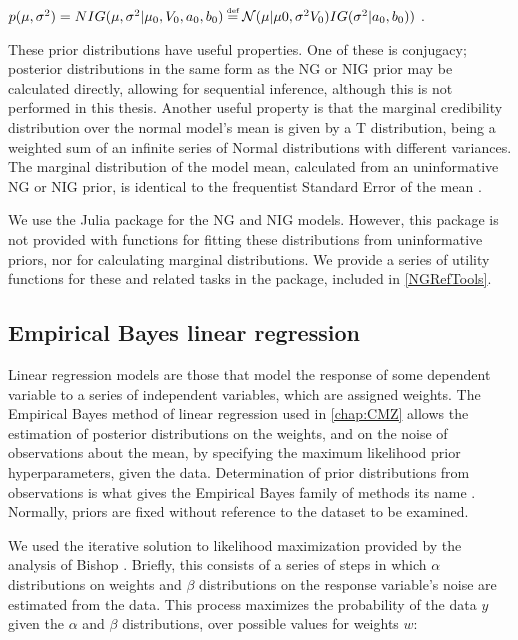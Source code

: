 \documentclass{ut-thesis}
\begin{document}
\begin{NoHyper}
$p(\mu,\sigma^2) = NIG(\mu,\sigma^{2}|\mu_{0},V_{0},a_{0},b_{0}) \mathrel{\stackrel{\makebox[0pt]{\mbox{\normalfont\tiny def}}}{=}} \mathcal{N}(\mu|\mu{0},\sigma^{2}V_{0})IG(\sigma^{2}|a_{0},b_{0}))$ \cite{Murphy2007}.

These prior distributions have useful properties. One of these is conjugacy; posterior distributions in the same form as the NG or NIG prior may be calculated directly, allowing for sequential inference, although this is not performed in this thesis. Another useful property is that the marginal credibility distribution over the normal model's mean is given by a T distribution, being a weighted sum of an infinite series of Normal distributions with different variances. The marginal distribution of the model mean, calculated from an uninformative NG or NIG prior, is identical to the frequentist Standard Error of the mean \cite{Murphy2007}.

We use the Julia package  for the NG and NIG models. However, this package is not provided with functions for fitting these distributions from uninformative priors, nor for calculating marginal distributions. We provide a series of utility functions for these and related tasks in the  package, included in \autoref{NGRefTools}.

\subsection{Empirical Bayes linear regression}
\label{ssec:EmpiricalBayes}
Linear regression models are those that model the response of some dependent variable to a series of independent variables, which are assigned weights. The Empirical Bayes method of linear regression used in \autoref{chap:CMZ} allows the estimation of posterior distributions on the weights, and on the noise of observations about the mean, by specifying the maximum likelihood prior hyperparameters, given the data. Determination of prior distributions from observations is what gives the Empirical Bayes family of methods its name \cite[p.373]{Bernardo2000}. Normally, priors are fixed without reference to the dataset to be examined.

We used the iterative solution to likelihood maximization provided by the analysis of Bishop \cite{Bishop2006}. Briefly, this consists of a series of steps in which $\alpha$ distributions on weights and $\beta$ distributions on the response variable's noise are estimated from the data. This process maximizes the probability of the data $y$ given the $\alpha$ and $\beta$ distributions, over possible values for weights $w$:


\end{NoHyper}
\end{document}
